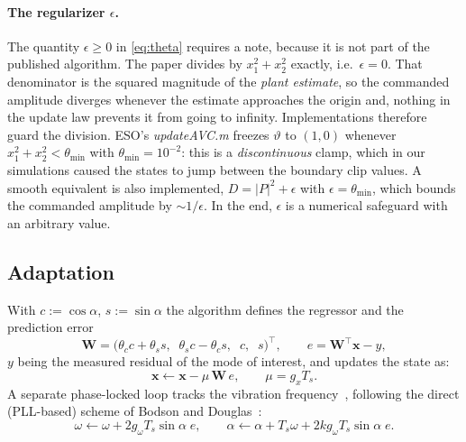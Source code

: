 \documentclass[11pt]{article}
\newcommand{\vx}{\mathbf{x}}
\newcommand{\vW}{\mathbf{W}}
\begin{document}
\paragraph{The regularizer $\epsilon$.}
The quantity $\epsilon\ge0$ in \eqref{eq:theta} requires a note, because it is not part of the published algorithm.
%
The paper divides by $x_1^2+x_2^2$ exactly, i.e.\ $\epsilon=0$.
%
That denominator is the squared magnitude of the \emph{plant estimate}, so the commanded amplitude diverges whenever the estimate approaches the origin and, nothing in the update law prevents it from going to infinity.
%
Implementations therefore guard the division.
%
ESO's \textit{updateAVC.m} freezes $\vartheta$ to $(1,0)$ whenever $x_1^2+x_2^2<\theta_{\min}$ with $\theta_{\min}=10^{-2}$: this is a \emph{discontinuous} clamp, which in our simulations caused the states to jump between the boundary clip values.
%
A smooth equivalent is also implemented, $D=|P|^2+\epsilon$ with $\epsilon=\theta_{\min}$, which bounds the commanded amplitude by $\sim\!1/\epsilon$.
%
In the end, $\epsilon$ is a numerical safeguard with an arbitrary value.

\subsection{Adaptation}

With $c := \cos\alpha$, $s := \sin\alpha$ the algorithm defines the
regressor and the prediction error
\begin{equation}
  \vW=\big(\theta_cc+\theta_ss,\;\;\theta_sc-\theta_cs,\;\;c,\;\;s\big)^\top,
  \qquad
  e=\vW^\top\vx-y ,
  \label{eq:W}
\end{equation}
$y$ being the measured residual of the mode of interest, and updates the
state as:
\begin{equation}
  \vx \leftarrow \vx-\mu\,\vW\,e,
  \qquad \mu=g_xT_s .
  \label{eq:update}
\end{equation}
A separate phase-locked loop tracks the vibration
frequency~\cite{gardner2005,lindsey1981}, following the direct
(PLL-based) scheme of Bodson and Douglas~\cite{bodson1997}:
\begin{equation}
  \omega\leftarrow\omega+2g_\omega T_s\sin\alpha\;e,
  \qquad
  \alpha\leftarrow\alpha+T_s\omega+2kg_\omega T_s\sin\alpha\;e .
  \label{eq:pll}
\end{equation}
%
\end{document}
